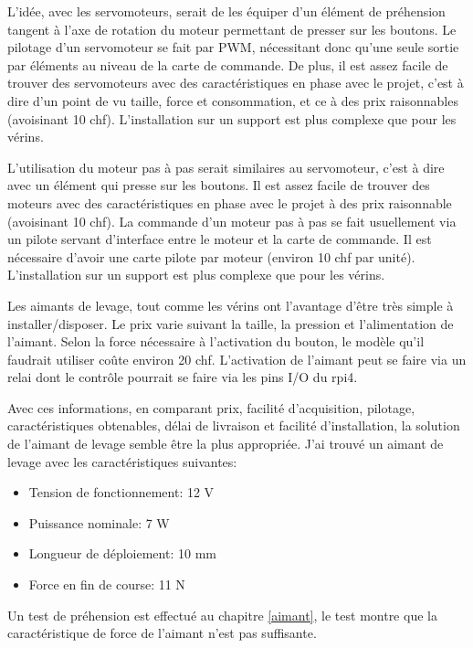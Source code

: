 L'idée, avec les servomoteurs, serait de les équiper d'un élément de préhension tangent à l'axe de rotation du moteur permettant de presser sur les boutons.
Le pilotage d'un servomoteur se fait par PWM, nécessitant donc qu'une seule sortie par éléments au niveau de la carte de commande. De plus, il est assez facile de
trouver des servomoteurs avec des caractéristiques en phase avec le projet, c'est à dire d'un point de vu taille, force et consommation, et ce à des prix
raisonnables (avoisinant 10 \Gls{chf}). L'installation sur un support est plus complexe que pour les vérins.

L'utilisation du moteur pas à pas serait similaires au servomoteur, c'est à dire avec un élément qui presse sur les boutons.
Il est assez facile de trouver des moteurs avec des caractéristiques en phase avec le projet à des prix raisonnable (avoisinant 10 \Gls{chf}). La commande d'un moteur pas à pas
se fait usuellement via un pilote servant d'interface entre le moteur et la carte de commande. Il est nécessaire d'avoir une carte pilote par moteur (environ 10 \Gls{chf} par unité).
L'installation sur un support est plus complexe que pour les vérins.

Les aimants de levage, tout comme les vérins ont l'avantage d'être très simple à installer/disposer. Le prix varie suivant la taille, la pression et l'alimentation de l'aimant.
Selon la force nécessaire à l'activation du bouton, le modèle qu'il faudrait utiliser coûte environ 20 \Gls{chf}. L'activation de l'aimant peut se faire via un relai dont le contrôle
pourrait se faire via les pins I/O du \Gls{rpi4}.

Avec ces informations, en comparant prix, facilité d'acquisition, pilotage, caractéristiques obtenables, délai de livraison et facilité d'installation, la solution de l'aimant de levage semble être la plus
appropriée. J'ai trouvé un aimant de levage avec les caractéristiques suivantes:
\begin{itemize}
    \item Tension de fonctionnement: 12 \si{\volt}
    \item Puissance nominale: 7 \si{\watt}
    \item Longueur de déploiement: 10 \si{\milli\metre}
    \item Force en fin de course: 11 \si {\newton}
\end{itemize}

Un test de préhension est effectué au chapitre \ref{aimant}, le test montre que la caractéristique de force de l'aimant n'est pas suffisante.

